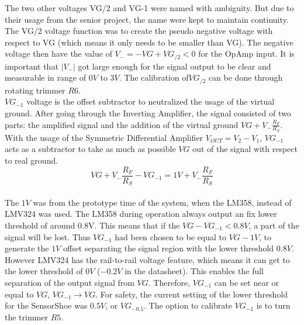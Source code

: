 \documentclass[12 pt, a4paper]{thesis}
\begin{document}
The two other voltages VG/2 and VG-1 were named with ambiguity. But due to their usage from the senior project, the name were kept to maintain continuity. \\
The VG/2 voltage function was to create the pseudo negative voltage with respect to VG (which means it only needs to be smaller than VG). The negative voltage then have the value of $V_{-}=-VG+VG_{/2}<0$ for the OpAmp input. It is important that $|V_{-}|$ got large enough for the signal output to be clear and measurable in range of $0V$ to $3V$. The calibration of$VG_{/2}$ can be done through rotating trimmer $R6$.\\
$VG_{-1}$ voltage is the offset subtractor to neutralized the usage of the virtual ground. After going through the Inverting Amplifier, the signal consisted of two parts: the amplified signal and the addition of the virtual ground $VG+V_{-}\frac{R_F}{R_S}$. With the usage of the Symmetric Differential Amplifier $V_{OUT} = V_2-V_1$, $VG_{-1}$ acts as a subtractor to take as much as possible $VG$ out of the signal with respect to real ground.
\begin{equation}
VG+V_{-}\frac{R_F}{R_S} - VG_{-1} = 1V + V_{-}\frac{R_F}{R_S}
\end{equation}
\\The $1V$ was from the prototype time of the system, when the LM358, instead of LMV324 was used. The LM358 during operation always output an fix lower threshold of around 0.8V. This means that if the $VG-VG_{-1}<0.8V$, a part of the signal will be lost. Thus $VG_{-1}$ had been chosen to be equal to $VG-1V$, to generate the $1V$ offset separating the signal region with the lower threshold $0.8V$. However LMV324 has the rail-to-rail voltage feature, which means it can get to the lower threshold of $0V$ ($-0.2V$ in the datasheet). This enables the full separation of the output signal from $VG$. Therefore, $VG_{-1}$ can be set near or equal to $VG$, $VG_{-1}\rightarrow VG$. For safety, the current setting of the lower threshold for the SensorShoe was $0.5V$, or $VG_{-0.5}$. The option to calibrate $VG_{-1}$ is to turn the trimmer $R5$. 
\end{document}
